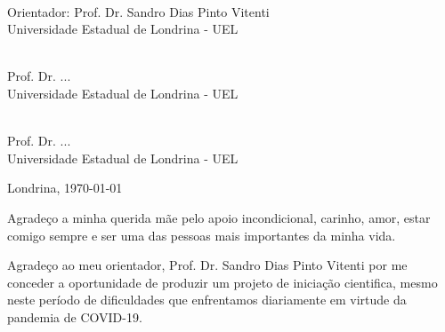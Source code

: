 \documentclass[12pt,a4paper,oneside,brazil]{abntex2}
\theoremstyle{definition}
\numberwithin{defin}{section}
\numberwithin{thm}{section}
\numberwithin{notation}{section}
\theoremstyle{remark}
\numberwithin{exmp}{section}
\numberwithin{p}{section}
\numberwithin{lema}{section}
\begin{document}
\begin{folhadeaprovacao}
\begin{flushright}
\begin{minipage}[c]{9.5cm}
				\begin{SingleSpace}
					\begin{center}
						\underline{\hspace{9cm}}\\
						Orientador: Prof. Dr. Sandro Dias Pinto Vitenti \\
						Universidade Estadual de Londrina - UEL
						\par\end{center}
					\begin{center}
						\vspace{1cm}
						\underline{\hspace{9cm}}\\
						Prof. Dr. ...\\
						Universidade Estadual de Londrina - UEL
						\par\end{center}
					\begin{center}
						\vspace{1cm}
						\underline{\hspace{9cm}} \\
						Prof. Dr. ... \\
						Universidade Estadual de Londrina - UEL
						\par\end{center}
				\end{SingleSpace}
				\vspace{1cm}
				
				\begin{center}
					Londrina, \today %
					\par\end{center}%
			\end{minipage}
			\par\end{flushright}
		
	\end{folhadeaprovacao}
	\begin{agradecimentos}
		Agradeço a minha querida mãe pelo apoio incondicional, carinho, amor, estar comigo sempre e ser uma das pessoas mais importantes da minha vida.
		
		Agradeço ao meu orientador, Prof. Dr. Sandro Dias Pinto Vitenti por me conceder a oportunidade de produzir um projeto de iniciação cientifica, mesmo neste período de dificuldades que enfrentamos diariamente em virtude da pandemia de COVID-19.
		
		  
	\end{agradecimentos}
		
\end{document}
